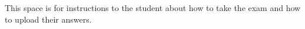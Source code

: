 
\vspace{5 cm}
This space is for instructions to the student about how to take the
exam and how to upload their answers.
\vfill
\eject
